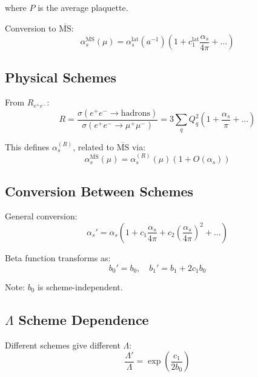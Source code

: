 \documentclass[11pt,a4paper]{article}
\theoremstyle{definition}
\begin{document}
where $P$ is the average plaquette.

Conversion to $\overline{\text{MS}}$:
\begin{equation}
\label{eq:lat-to-msbar}
\alpha_s^{\overline{\text{MS}}}(\mu) = \alpha_s^{\text{lat}}(a^{-1})\left(1 + c_1^{\text{lat}}\frac{\alpha_s}{4\pi} + \ldots\right)
\end{equation}

\subsection{Physical Schemes}
\label{subsec:physical-schemes}

From $R_{e^+e^-}$:
\begin{equation}
\label{eq:r-ratio}
R = \frac{\sigma(e^+e^- \to \text{hadrons})}{\sigma(e^+e^- \to \mu^+\mu^-)}
  = 3\sum_q Q_q^2 \left(1 + \frac{\alpha_s}{\pi} + \ldots\right)
\end{equation}

This defines $\alpha_s^{(R)}$, related to $\overline{\text{MS}}$ via:
\begin{equation}
\label{eq:alpha-r-to-msbar}
\alpha_s^{\overline{\text{MS}}}(\mu) = \alpha_s^{(R)}(\mu)\left(1 + O(\alpha_s)\right)
\end{equation}

\subsection{Conversion Between Schemes}
\label{subsec:scheme-conversion}

General conversion:
\begin{equation}
\label{eq:general-conversion}
\alpha_s' = \alpha_s\left(1 + c_1\frac{\alpha_s}{4\pi} + c_2\left(\frac{\alpha_s}{4\pi}\right)^2 + \ldots\right)
\end{equation}

Beta function transforms as:
\begin{equation}
\label{eq:beta-transform-app}
b_0' = b_0, \quad b_1' = b_1 + 2c_1 b_0
\end{equation}

Note: $b_0$ is scheme-independent.

\subsection{$\Lambda$ Scheme Dependence}
\label{subsec:lambda-scheme-dep}

Different schemes give different $\Lambda$:
\begin{equation}
\label{eq:lambda-scheme-ratio}
\frac{\Lambda'}{\Lambda} = \exp\left(\frac{c_1}{2b_0}\right)
\end{equation}
\end{document}
